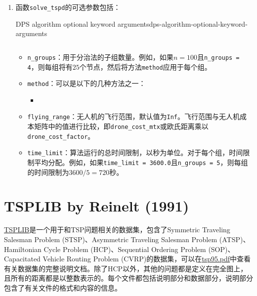 \begin{enumerate}
    \item 函数\texttt{solve_tspd}的可选参数包括：

\begin{code}{DPS algorithm optional keyword arguments}{dps-algorithm-optional-keyword-arguments}
    \inputminted{julia}{code/DPS-usage-examples/dps-optional-keyword-arguments.jl}
\end{code}
    \begin{itemize}
        \item \texttt{n\_groups}：用于分治法的子组数量。例如，如果$n = 100$且\texttt{n\_groups = 4}，则每组将有$25$个节点，然后将方法\texttt{method}应用于每个组。
        \item \texttt{method}：可以是以下的几种方法之一\cite{agatzOptimizationApproachesTraveling2018}：
        \begin{itemize}
            \item
        \end{itemize}
        \item \texttt{flying\_range}：无人机的飞行范围，默认值为\texttt{Inf}。飞行范围与无人机成本矩阵中的值进行比较，即\texttt{drone\_cost\_mtx}或欧氏距离乘以\texttt{drone\_cost\_factor}。
        \item \texttt{time\_limit}：算法运行的总时间限制，以秒为单位。对于每个组，时间限制平均分配。例如，如果\texttt{time\_limit = 3600.0}且\texttt{n\_groups = 5}，则每组的时间限制为$3600/5=720$秒。
    \end{itemize}
\end{enumerate}

\section{TSPLIB by Reinelt (1991)}
\href{http://comopt.ifi.uni-heidelberg.de/software/TSPLIB95/}{TSPLIB}是一个用于和TSP问题相关的数据集，包含了Symmetric Traveling Salesman Problem (STSP)、Asymmetric Traveling Salesman Problem (ATSP)、Hamiltonian Cycle Problem (HCP)、Sequential Ordering Problem (SOP)、Capacitated Vehicle Routing Problem (CVRP)的数据集，可以在\href{http://comopt.ifi.uni-heidelberg.de/software/TSPLIB95/tsp95.pdf}{tsp95.pdf}中查看有关数据集的完整说明文档。除了HCP以外，其他的问题都是定义在完全图上，且所有的距离都是以整数表示的。每个文件都包括说明部分和数据部分，说明部分包含了有关文件的格式和内容的信息。


